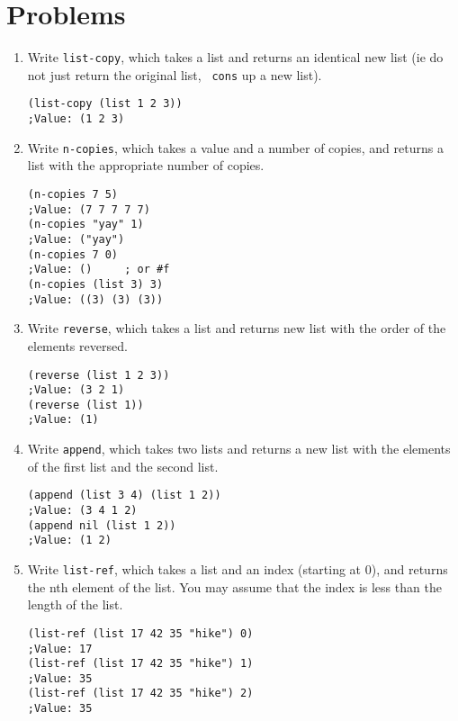 


\section*{Problems}

\begin{enumerate}
\item Write {\tt list-copy}, which takes a list and returns an
identical new list (ie do not just return the original list, {\tt
cons} up a new list).
\begin{verbatim}
(list-copy (list 1 2 3))
;Value: (1 2 3)
\end{verbatim}
\vspace{1in}

\item Write {\tt n-copies}, which takes a value and a number of
copies, and returns a list with the appropriate number of copies.
\begin{verbatim}
(n-copies 7 5)
;Value: (7 7 7 7 7)
(n-copies "yay" 1)
;Value: ("yay")
(n-copies 7 0)
;Value: ()     ; or #f
(n-copies (list 3) 3)
;Value: ((3) (3) (3))
\end{verbatim}
\vspace{1in}

\item Write {\tt reverse}, which takes a list and returns new list
with the order of the elements reversed.
\begin{verbatim}
(reverse (list 1 2 3))
;Value: (3 2 1)
(reverse (list 1))
;Value: (1)
\end{verbatim}
\vspace{1.5in}

\item Write {\tt append}, which takes two lists and returns a new list
with the elements of the first list and the second list.
\begin{verbatim}
(append (list 3 4) (list 1 2))
;Value: (3 4 1 2)
(append nil (list 1 2))
;Value: (1 2)
\end{verbatim}
\vspace{1in}

\item Write {\tt list-ref}, which takes a list and an index (starting
at 0), and returns the nth element of the list.  You may assume that
the index is less than the length of the list.

\begin{verbatim}
(list-ref (list 17 42 35 "hike") 0)
;Value: 17
(list-ref (list 17 42 35 "hike") 1)
;Value: 35
(list-ref (list 17 42 35 "hike") 2)
;Value: 35
\end{verbatim}
\vspace{1in}


\end{enumerate}
